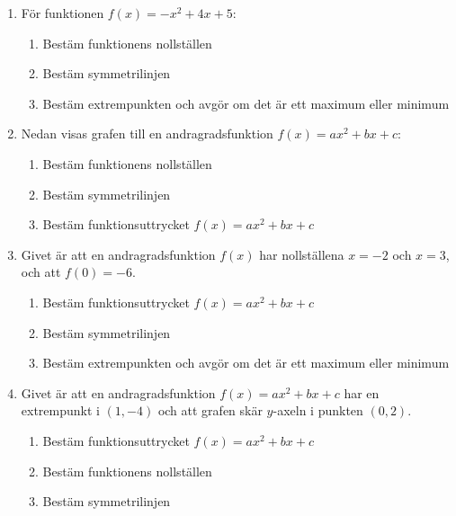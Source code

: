 \documentclass[a4paper,11pt]{article}
\begin{document}
\begin{enumerate}[label=\textbf{\arabic*.}]
    \item För funktionen $f(x) = -x^2 + 4x + 5$:
    \begin{enumerate}[label=\alph*)]
        \item Bestäm funktionens nollställen
        \item Bestäm symmetrilinjen
        \item Bestäm extrempunkten och avgör om det är ett maximum eller minimum
    \end{enumerate}
    \break
    \item Nedan visas grafen till en andragradsfunktion $f(x) = ax^2 + bx + c$:
    
    \begin{center}
    \end{center}
    
    \begin{enumerate}[label=\alph*)]
        \item Bestäm funktionens nollställen
        \item Bestäm symmetrilinjen
        \item Bestäm funktionsuttrycket $f(x) = ax^2 + bx + c$
    \end{enumerate}
    
    \item Givet är att en andragradsfunktion $f(x)$ har nollställena $x = -2$ och $x = 3$, och att $f(0) = -6$.
    \begin{enumerate}[label=\alph*)]
        \item Bestäm funktionsuttrycket $f(x) = ax^2 + bx + c$
        \item Bestäm symmetrilinjen
        \item Bestäm extrempunkten och avgör om det är ett maximum eller minimum
    \end{enumerate}
    
    \item Givet är att en andragradsfunktion $f(x) = ax^2 + bx + c$ har en extrempunkt i $(1, -4)$ och att grafen skär $y$-axeln i punkten $(0, 2)$.
    \begin{enumerate}[label=\alph*)]
        \item Bestäm funktionsuttrycket $f(x) = ax^2 + bx + c$
        \item Bestäm funktionens nollställen
        \item Bestäm symmetrilinjen
    \end{enumerate}
\end{enumerate}
\end{document}
